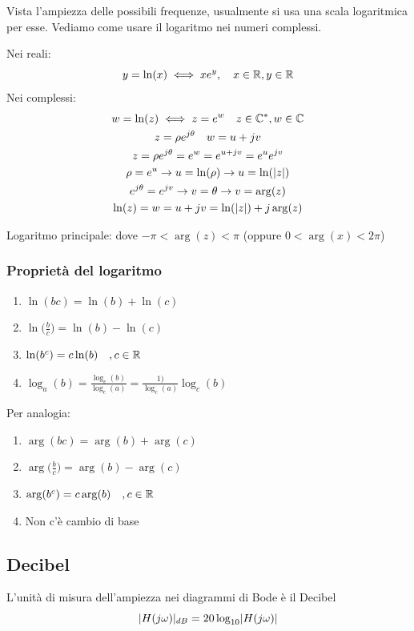 Vista l'ampiezza delle possibili frequenze, usualmente si usa una scala logaritmica per esse. Vediamo come usare il logaritmo nei numeri complessi.

Nei reali: 
\begin{equation*}
	y=\ln (x) \iff x e^y, \quad x \in \mathbb{R}, y \in \mathbb{R} 
\end{equation*}
Nei complessi: %
\begin{gather*}
	w = \ln (z) \iff z=e^w \quad z \in \mathbb{C}^*, w \in \mathbb{C} \\
	z=\rho e^{j \theta} \quad w=u+jv\\
	z= \rho e^{j \theta} = e^w=e^{u+jv} = e^u e^{jv}\\
	\rho = e^u \rightarrow u = \ln(\rho) \rightarrow u =\ln(\lvert z\rvert)\\
	e^{j\theta} = e^{jv} \rightarrow v = \theta \rightarrow v= \arg (z)\\
	\ln (z) = w = u+jv = \ln (\lvert z\rvert) + j \arg (z)
\end{gather*}

Logaritmo principale: dove $ -\pi < \arg (z) < \pi $ (oppure $ 0< \arg (x) <2\pi $)

\subsubsection{Proprietà del logaritmo}
\begin{enumerate}
	\item $ \ln ( b c) = \ln (b) + \ln (c) $
	\item $ \ln \Big(\frac{b}{c}\Big) = \ln (b) - \ln (c) $
	\item $ \ln (b^c) = c \ln (b) \quad ,c \in \mathbb{R}$
	\item $ \log_a (b)  = \frac{\log_c (b)}{\log_c (a)}=\frac{1)}{\log_c (a)}\log_c (b)$
\end{enumerate}

Per analogia:
\begin{enumerate}
	\item $ \arg ( b c) = \arg (b) + \arg (c) $
	\item $ \arg \Big(\frac{b}{c}\Big) = \arg (b) - \arg (c) $
	\item $ \arg (b^c) = c \arg (b) \quad ,c \in \mathbb{R}$
	\item Non c'è cambio di base
\end{enumerate}

\subsection{Decibel}
L'unità di misura dell'ampiezza nei diagrammi di Bode è il Decibel
\[
\lvert H(j\omega)\rvert_{dB} = 20 \log_{10}\lvert H(j\omega)\rvert
\]

